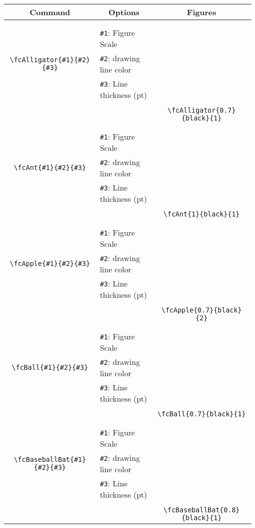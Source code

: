 \documentclass{article}
\begin{document}
\begin{table}[H]\centering\begin{tabular}{|c|l|c|}\hline {\bf Command}& \multicolumn{1}{c|}{{\bf Options}} & {\bf Figures}\\  \hline	&&\multirow{5}{*}{\fcAlligator{0.7}{black}{1}}\\	&&\\	&\verb|#1|: Figure Scale &\\	\verb|\fcAlligator{#1}{#2}{#3}|&	\verb|#2|: drawing line color &\\	&\verb|#3|: Line thickness (pt) &\\ &&\\&&	\verb|\fcAlligator{0.7}{black}{1}|\\\hline 	
	&&\multirow{5}{*}{\fcAnt{1}{black}{1}}\\	&&\\	&\verb|#1|: Figure Scale &\\	\verb|\fcAnt{#1}{#2}{#3}|&	\verb|#2|: drawing line color &\\	&\verb|#3|: Line thickness (pt) &\\ &&\\&&	\verb|\fcAnt{1}{black}{1}|\\\hline 	
	&&\multirow{5}{*}{\fcApple{0.7}{black}{2}}\\	&&\\	&\verb|#1|: Figure Scale &\\	\verb|\fcApple{#1}{#2}{#3}|&	\verb|#2|: drawing line color &\\	&\verb|#3|: Line thickness (pt) &\\ &&\\&&	\verb|\fcApple{0.7}{black}{2}|\\\hline 	
	&&\multirow{5}{*}{\fcBall{0.7}{black}{1}}\\	&&\\	&\verb|#1|: Figure Scale &\\	\verb|\fcBall{#1}{#2}{#3}|&	\verb|#2|: drawing line color &\\	&\verb|#3|: Line thickness (pt) &\\ &&\\&&	\verb|\fcBall{0.7}{black}{1}|\\\hline 	
	&&\multirow{5}{*}{\fcBaseballBat{0.8}{black}{1}}\\	&&\\	&\verb|#1|: Figure Scale &\\	\verb|\fcBaseballBat{#1}{#2}{#3}|&	\verb|#2|: drawing line color &\\	&\verb|#3|: Line thickness (pt) &\\ &&\\&&	\verb|\fcBaseballBat{0.8}{black}{1}|\\\hline 	

\end{tabular}
\end{table}
\end{document}
